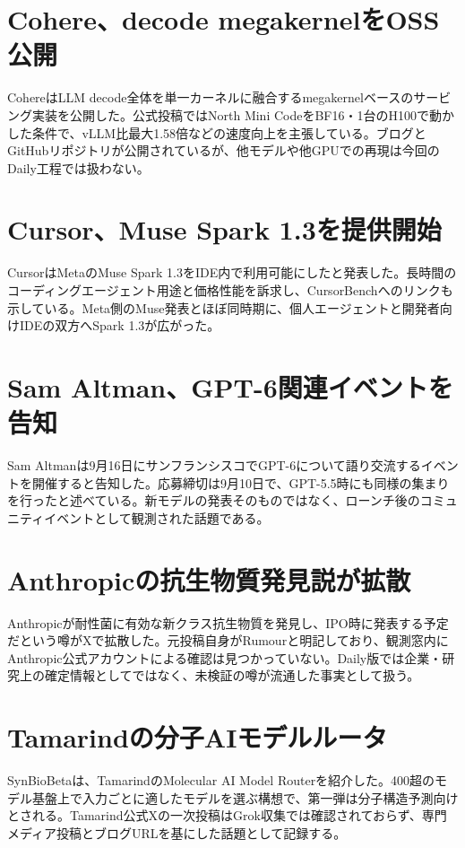 \section{Cohere、decode megakernelをOSS公開}
CohereはLLM decode全体を単一カーネルに融合するmegakernelベースのサービング実装を公開した。公式投稿ではNorth Mini CodeをBF16・1台のH100で動かした条件で、vLLM比最大1.58倍などの速度向上を主張している。ブログとGitHubリポジトリが公開されているが、他モデルや他GPUでの再現は今回のDaily工程では扱わない。
\section{Cursor、Muse Spark 1.3を提供開始}
CursorはMetaのMuse Spark 1.3をIDE内で利用可能にしたと発表した。長時間のコーディングエージェント用途と価格性能を訴求し、CursorBenchへのリンクも示している。Meta側のMuse発表とほぼ同時期に、個人エージェントと開発者向けIDEの双方へSpark 1.3が広がった。
\section{Sam Altman、GPT-6関連イベントを告知}
Sam Altmanは9月16日にサンフランシスコでGPT-6について語り交流するイベントを開催すると告知した。応募締切は9月10日で、GPT-5.5時にも同様の集まりを行ったと述べている。新モデルの発表そのものではなく、ローンチ後のコミュニティイベントとして観測された話題である。
\section{Anthropicの抗生物質発見説が拡散}
Anthropicが耐性菌に有効な新クラス抗生物質を発見し、IPO時に発表する予定だという噂がXで拡散した。元投稿自身がRumourと明記しており、観測窓内にAnthropic公式アカウントによる確認は見つかっていない。Daily版では企業・研究上の確定情報としてではなく、未検証の噂が流通した事実として扱う。
\section{Tamarindの分子AIモデルルータ}
SynBioBetaは、TamarindのMolecular AI Model Routerを紹介した。400超のモデル基盤上で入力ごとに適したモデルを選ぶ構想で、第一弾は分子構造予測向けとされる。Tamarind公式Xの一次投稿はGrok収集では確認されておらず、専門メディア投稿とブログURLを基にした話題として記録する。
